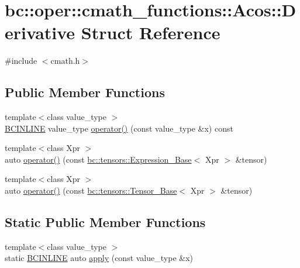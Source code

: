 \hypertarget{structbc_1_1oper_1_1cmath__functions_1_1Acos_1_1Derivative}{}\section{bc\+:\+:oper\+:\+:cmath\+\_\+functions\+:\+:Acos\+:\+:Derivative Struct Reference}
\label{structbc_1_1oper_1_1cmath__functions_1_1Acos_1_1Derivative}


{\ttfamily \#include $<$cmath.\+h$>$}

\subsection*{Public Member Functions}
\begin{DoxyCompactItemize}
\item 
{\footnotesize template$<$class value\+\_\+type $>$ }\\\hyperlink{common_8h_a6699e8b0449da5c0fafb878e59c1d4b1}{B\+C\+I\+N\+L\+I\+NE} value\+\_\+type \hyperlink{structbc_1_1oper_1_1cmath__functions_1_1Acos_1_1Derivative_a8d0cacc5929d927d1b24c583b4f35b25}{operator()} (const value\+\_\+type \&x) const
\item 
{\footnotesize template$<$class Xpr $>$ }\\auto \hyperlink{structbc_1_1oper_1_1cmath__functions_1_1Acos_1_1Derivative_a65ab425c53962ae36c86093278cf701e}{operator()} (const \hyperlink{classbc_1_1tensors_1_1Expression__Base}{bc\+::tensors\+::\+Expression\+\_\+\+Base}$<$ Xpr $>$ \&tensor)
\item 
{\footnotesize template$<$class Xpr $>$ }\\auto \hyperlink{structbc_1_1oper_1_1cmath__functions_1_1Acos_1_1Derivative_a4f8f6a12dbb42e6008ff7e14d9b48784}{operator()} (const \hyperlink{classbc_1_1tensors_1_1Tensor__Base}{bc\+::tensors\+::\+Tensor\+\_\+\+Base}$<$ Xpr $>$ \&tensor)
\end{DoxyCompactItemize}
\subsection*{Static Public Member Functions}
\begin{DoxyCompactItemize}
\item 
{\footnotesize template$<$class value\+\_\+type $>$ }\\static \hyperlink{common_8h_a6699e8b0449da5c0fafb878e59c1d4b1}{B\+C\+I\+N\+L\+I\+NE} auto \hyperlink{structbc_1_1oper_1_1cmath__functions_1_1Acos_1_1Derivative_abf85426b7cb575d603e14665e4b70cd6}{apply} (const value\+\_\+type \&x)
\end{DoxyCompactItemize}


